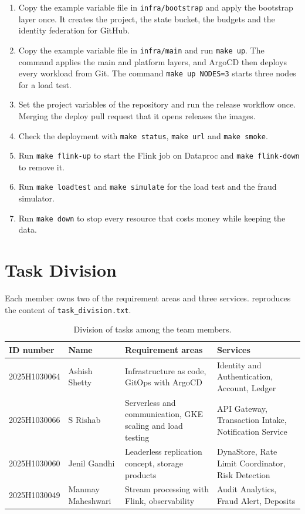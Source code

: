 \documentclass[11pt,a4paper]{article}
\newcommand{\code}[1]{\texttt{#1}}
\begin{document}
\begin{enumerate}
\item Copy the example variable file in \code{infra/bootstrap} and apply the bootstrap layer once. It creates the project, the state bucket, the budgets and the identity federation for GitHub.
\item Copy the example variable file in \code{infra/main} and run \code{make up}. The command applies the main and platform layers, and ArgoCD then deploys every workload from Git. The command \code{make up NODES=3} starts three nodes for a load test.
\item Set the project variables of the repository and run the release workflow once. Merging the deploy pull request that it opens releases the images.
\item Check the deployment with \code{make status}, \code{make url} and \code{make smoke}.
\item Run \code{make flink-up} to start the Flink job on Dataproc and \code{make flink-down} to remove it.
\item Run \code{make loadtest} and \code{make simulate} for the load test and the fraud simulator.
\item Run \code{make down} to stop every resource that costs money while keeping the data.
\end{enumerate}

\section{Task Division}
\label{app:tasks}

Each member owns two of the requirement areas and three services.  reproduces the content of \code{task\_division.txt}.

\begin{table}[H]\centering\small
\caption{Division of tasks among the team members.}\label{tab:tasks}
\begin{tabularx}{\linewidth}{@{}L{2.9cm}L{1.9cm}YY@{}}
\toprule
ID number & Name & Requirement areas & Services \\
\midrule
2025H1030064 & Ashish Shetty & Infrastructure as code, GitOps with ArgoCD & Identity and Authentication, Account, Ledger \\
2025H1030066  & S Rishab  & Serverless and communication, GKE scaling and load testing & API Gateway, Transaction Intake, Notification Service \\
2025H1030060  & Jenil Gandhi & Leaderless replication concept, storage products & DynaStore, Rate Limit Coordinator, Risk Detection \\
2025H1030049  & Manmay Maheshwari & Stream processing with Flink, observability & Audit Analytics, Fraud Alert, Deposits \\
\bottomrule
\end{tabularx}
\end{table}
\end{document}
